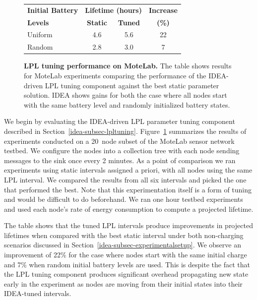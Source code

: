 \begin{figure}[t]
\begin{center}
\begin{tabular}{|l|ccc|}
\hline
\textbf{Initial Battery} & \multicolumn{2}{c}{\textbf{Lifetime (hours)}} & \textbf{Increase} \\
\textbf{Levels} & \textbf{Static} & \textbf{Tuned} & \textbf{(\%)} \\ \hline
Uniform & 4.6 & 5.6 & 22\\
Random & 2.8 & 3.0 & 7 \\ \hline
\end{tabular}
\end{center}

\caption{\textbf{LPL tuning performance on MoteLab.} The table shows results
for MoteLab experiments comparing the performance of the IDEA-driven LPL
tuning component against the best static parameter solution. IDEA shows gains
for both the case where all nodes start with the same battery level and
randomly initialized battery states.}

\label{idea-table-lplvoptimalmotelab}
\end{figure}

We begin by evaluating the IDEA-driven LPL parameter tuning component
described in Section~\ref{idea-subsec-lpltuning}.
Figure~\ref{idea-table-lplvoptimalmotelab} summarizes the results of
experiments conducted on a 20~node subset of the MoteLab sensor network
testbed. We configure the nodes into a collection tree with each node sending
messages to the sink once every 2 minutes. As a point of comparison we ran
experiments using static intervals assigned a priori, with all nodes using
the same LPL interval. We compared the results from all six intervals and
picked the one that performed the best. Note that this experimentation itself
is a form of tuning and would be difficult to do beforehand. We ran one hour
testbed experiments and used each node's rate of energy consumption to
compute a projected lifetime.

The table shows that the tuned LPL intervals produce improvements in
projected lifetimes when compared with the best static interval under both
non-charging scenarios discussed in
Section~\ref{idea-subsec-experimentalsetup}. We observe an improvement of
22\% for the case where nodes start with the same initial charge and 7\% when
random initial battery levels are used. This is despite the fact that the LPL
tuning component produces significant overhead propagating new state early in
the experiment as nodes are moving from their initial states into their
IDEA-tuned intervals.

